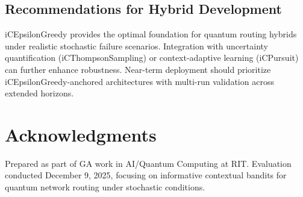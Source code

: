 \documentclass[12pt,a4paper]{article}
\begin{document}
\subsection{Recommendations for Hybrid Development}
iCEpsilonGreedy provides the optimal foundation for quantum routing hybrids under realistic stochastic failure scenarios. Integration with uncertainty quantification (iCThompsonSampling) or context-adaptive learning (iCPursuit) can further enhance robustness. Near-term deployment should prioritize iCEpsilonGreedy-anchored architectures with multi-run validation across extended horizons.

\section{Acknowledgments}
Prepared as part of GA work in AI/Quantum Computing at RIT. Evaluation conducted December 9, 2025, focusing on informative contextual bandits for quantum network routing under stochastic conditions.
\end{document}

